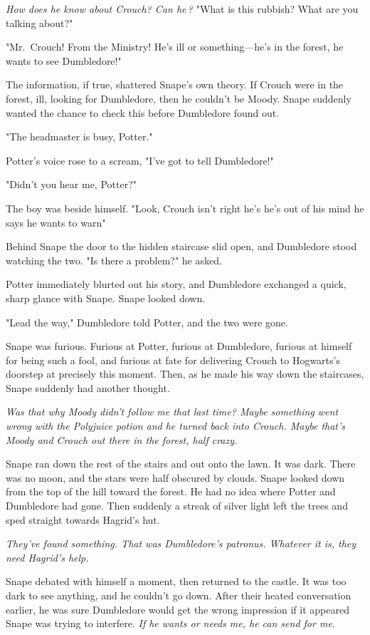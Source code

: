 \emph{How does he know about Crouch? Can he{\el}\,?} "What is this rubbish? What are you talking about?"

"Mr.~Crouch! From the Ministry! He's ill or something—he's in the forest, he wants to see Dumbledore!"

The information, if true, shattered Snape's own theory. If Crouch were in the forest, ill, looking for Dumbledore, then he couldn't be Moody. Snape suddenly wanted the chance to check this before Dumbledore found out.

"The headmaster is busy, Potter."

Potter's voice rose to a scream, "I've got to tell Dumbledore!"

"Didn't you hear me, Potter?"

The boy was beside himself. "Look, Crouch isn't right{\el} he's{\el} he's out of his mind{\el} he says he wants to warn{\el}"

Behind Snape the door to the hidden staircase slid open, and Dumbledore stood watching the two. "Is there a problem?" he asked.

Potter immediately blurted out his story, and Dumbledore exchanged a quick, sharp glance with Snape. Snape looked down.

"Lead the way," Dumbledore told Potter, and the two were gone.

Snape was furious. Furious at Potter, furious at Dumbledore, furious at himself for being such a fool, and furious at fate for delivering Crouch to Hogwarts's doorstep at precisely this moment. Then, as he made his way down the staircases, Snape suddenly had another thought.

\emph{Was that why Moody didn't follow me that last time? Maybe something went wrong with the Polyjuice potion and he turned back into Crouch. Maybe that's Moody and Crouch out there in the forest, half crazy.}

Snape ran down the rest of the stairs and out onto the lawn. It was dark. There was no moon, and the stars were half obscured by clouds. Snape looked down from the top of the hill toward the forest. He had no idea where Potter and Dumbledore had gone. Then suddenly a streak of silver light left the trees and sped straight towards Hagrid's hut.

\emph{They've found something. That was Dumbledore's patronus. Whatever it is, they need Hagrid's help.}

Snape debated with himself a moment, then returned to the castle. It was too dark to see anything, and he couldn't go down. After their heated conversation earlier, he was sure Dumbledore would get the wrong impression if it appeared Snape was trying to interfere. \emph{If he wants or needs me, he can send for me.}

